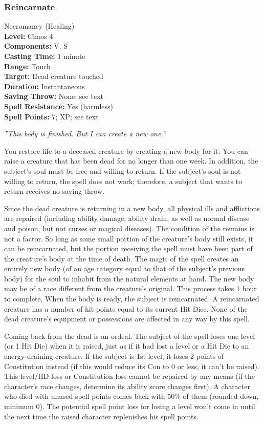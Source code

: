 \subsubsection{Reincarnate}
\label{Spell:Reincarnate}
Necromancy (Healing)
\\ \textbf{Level:} Chaos 4
\\ \textbf{Components:} V, S
\\ \textbf{Casting Time:} 1 minute
\\ \textbf{Range:} Touch
\\ \textbf{Target:} Dead creature touched
\\ \textbf{Duration:} Instantaneous
\\ \textbf{Saving Throw:} None; see text
\\ \textbf{Spell Resistance:} Yes (harmless)
\\ \textbf{Spell Points:} 7; XP; see text

\emph{''This body is finished. But I can create a new one.``}

You restore life to a deceased creature by creating a new body for it. 
You can raise a creature that has been dead for no longer than one week. 
In addition, the subject's soul must be free and willing to return. 
If the subject's soul is not willing to return, the spell does not work; 
therefore, a subject that wants to return receives no saving throw.

Since the dead creature is returning in a new body, all physical ills and afflictions are repaired 
(including ability damage, ability drain, as well as normal disease and poison, but not curses or magical diseases).
The condition of the remains is not a factor.
So long as some small portion of the creature's body still exists, 
it can be reincarnated, but the portion receiving the spell must have been part of the creature's body at the time of death. 
The magic of the spell creates an entirely new body (of an age category equal to that of the subject's previous body) 
for the soul to inhabit from the natural elements at hand.
The new body may be of a race different from the creature's original.
This process takes 1 hour to complete. When the body is ready, the subject is reincarnated.
A reincarnated creature has a number of hit points equal to its current Hit Dice.
None of the dead creature's equipment or possessions are affected in any way by this spell.

Coming back from the dead is an ordeal. 
The subject of the spell loses one level (or 1 Hit Die) when it is raised, 
just as if it had lost a level or a Hit Die to an energy-draining creature. 
If the subject is 1st level, 
it loses 2 points of Constitution instead (if this would reduce its Con to 0 or less, it can't be raised). 
This level/HD loss or Constitution loss cannot be repaired by any means (if the character's race changes, determine its ability score changes first). 
A character who died with unused spell points comes back with 50\% of them (rounded down, minimum 0).
The potential spell point loss for losing a level won't come in until the next time the raised character replenishes his spell points.


